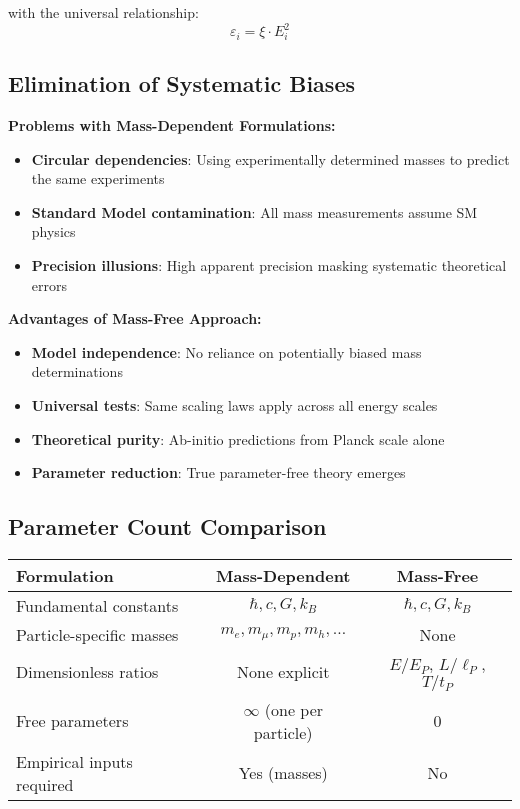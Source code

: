 \documentclass[12pt,a4paper]{report}
\newcommand{\xipar}{\xi}      %
\begin{document}
with the universal relationship:
\begin{equation}
	\varepsilon_i = \xipar \cdot E_i^2
\end{equation}

\subsection*{Elimination of Systematic Biases}

\textbf{Problems with Mass-Dependent Formulations:}
\begin{itemize}
	\item \textbf{Circular dependencies}: Using experimentally determined masses to predict the same experiments
	\item \textbf{Standard Model contamination}: All mass measurements assume SM physics
	\item \textbf{Precision illusions}: High apparent precision masking systematic theoretical errors
\end{itemize}

\textbf{Advantages of Mass-Free Approach:}
\begin{itemize}
	\item \textbf{Model independence}: No reliance on potentially biased mass determinations
	\item \textbf{Universal tests}: Same scaling laws apply across all energy scales
	\item \textbf{Theoretical purity}: Ab-initio predictions from Planck scale alone
	\item \textbf{Parameter reduction}: True parameter-free theory emerges
\end{itemize}

\subsection*{Parameter Count Comparison}

\begin{center}
	\begin{tabular}{|l|c|c|}
		\hline
		\textbf{Formulation} & \textbf{Mass-Dependent} & \textbf{Mass-Free} \\
		\hline
		\hline
		Fundamental constants & $\hbar, c, G, k_B$ & $\hbar, c, G, k_B$ \\
		\hline
		Particle-specific masses & $m_e, m_\mu, m_p, m_h, \ldots$ & None \\
		\hline
		Dimensionless ratios & None explicit & $E/E_P$, $L/\ell_P$, $T/t_P$ \\
		\hline
		Free parameters & $\infty$ (one per particle) & 0 \\
		\hline
		Empirical inputs required & Yes (masses) & No \\
		\hline
	\end{tabular}
\end{center}
\end{document}
